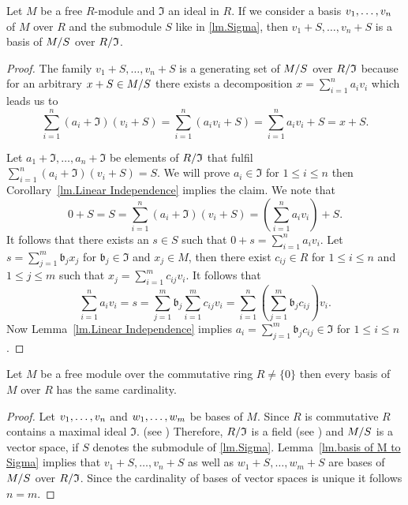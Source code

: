 \begin{lem}\label{lm.basis of M to Sigma}
Let $M$ be a free $R$-module and $\mathfrak{I}$ an ideal in $R$. If we consider a basis $\seq{v}$ of $M$ over $R$ and the submodule $S$ like in \cref{lm.Sigma}, then $v_1+S,\ldots,v_n+S$ is a basis of $\nicefrac{M}{S}$ over $\nicefrac{R}{\mathfrak{I}}$.
\end{lem}
\begin{proof}
The family $v_1+S,\ldots,v_n+S$ is a generating set of $\nicefrac{M}{S}$ over $\nicefrac{R}{\mathfrak{I}}$ because for an arbitrary $x+S\in\nicefrac{M}{S}$ there exists a decomposition $x=\sum_{i=1}^na_iv_i$ which leads us to 
\begin{equation*}
\sum_{i=1}^n(a_i+\mathfrak{I})(v_i+S)=\sum_{i=1}^n(a_iv_i+S)=\sum_{i=1}^na_iv_i+S=x+S.
\end{equation*}

Let $a_1+\mathfrak{I},\ldots,a_n+\mathfrak{I}$ be elements of $\nicefrac{R}{\mathfrak{I}}$ that fulfil $\sum_{i=1}^n(a_i+\mathfrak{I})(v_i+S)=S$. We will prove $a_i\in\mathfrak{I}$ for $1\leq i\leq n$ then Corollary~\ref{lm.Linear Independence} implies the claim. We note that 
\begin{equation*}
0+S=S=\sum_{i=1}^n(a_i+\mathfrak{I})(v_i+S)=\left(\sum_{i=1}^n a_iv_i\right)+S.
\end{equation*}
It follows that there exists an $s\in S$ such that $0+s=\sum_{i=1}^n a_iv_i$. Let $s=\sum_{j=1}^m\mathfrak{b}_jx_j$ for $\mathfrak{b}_j\in \mathfrak{I}$ and $x_j\in M$, then there exist $c_{ij}\in R$ for $1\leq i\leq n$ and $1\leq j\leq m$ such that $x_j=\sum_{i=1}^mc_{ij}v_i$. It follows that
\begin{equation*}
\sum_{i=1}^n a_iv_i=s=\sum_{j=1}^m\mathfrak{b}_j\sum_{i=1}^mc_{ij}v_i=\sum_{i=1}^n\left(\sum_{j=1}^m\mathfrak{b}_jc_{ij}\right)v_i.
\end{equation*}
Now Lemma~\ref{lm.Linear Independence} implies $a_i=\sum_{j=1}^m\mathfrak{b}_jc_{ij}\in \mathfrak{I}$ for $1\leq i\leq n$.
\end{proof}

\begin{thm}
Let $M$ be a free module over the commutative ring $R\neq\lbrace 0\rbrace$ then every basis of $M$ over $R$ has the same cardinality.
\end{thm}
\begin{proof}
Let $\seq{v}$ and $\seq[m]{w}$ be bases of $M$. Since $R$ is commutative $R$ contains a maximal ideal $\mathfrak{I}$. (see \cite[Thm.III.3.6]{jantzen2005algebra}) Therefore, $\nicefrac{R}{\mathfrak{I}}$ is a field (see \cite[p.93]{lang2002algebra}) and $\nicefrac{M}{S}$ is a vector space, if $S$ denotes the submodule of \cref{lm.Sigma}. Lemma~\ref{lm.basis of M to Sigma} implies that $v_1+S,\ldots,v_n+S$ as well as $w_1+S,\ldots,w_m+S$ are bases of $\nicefrac{M}{S}$ over $\nicefrac{R}{\mathfrak{I}}$. Since the cardinality of bases of vector spaces is unique it follows $n=m$.
\end{proof}